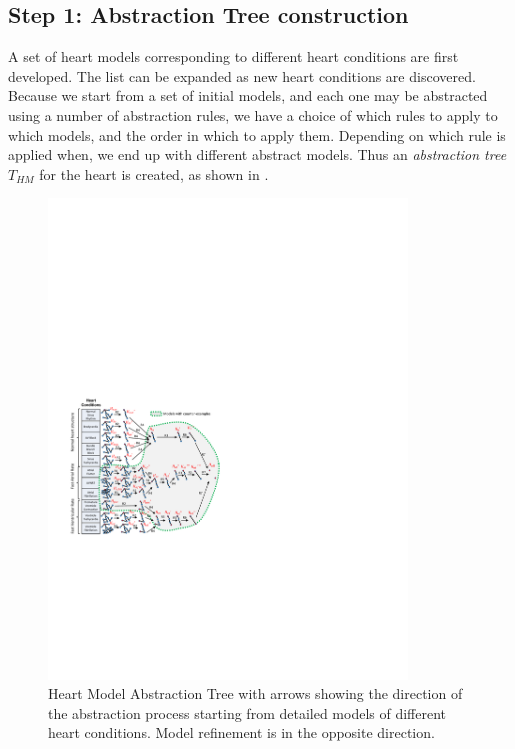 \subsection*{Step 1: Abstraction Tree construction}
A set of heart models corresponding to different heart conditions are first developed. 
The list can be expanded as new heart conditions are discovered.
Because we start from a set of initial models, and each one may be abstracted using a number of abstraction rules, we have a choice of which rules to apply to which models, and the order in which to apply them. 
Depending on which rule is applied when, we end up with different abstract models.
Thus an \emph{abstraction tree} $T_{HM}$ for the heart is created, as shown in . 
\begin{figure}[!t]
	\centering
	\includegraphics[width=0.85\textwidth]{figs/abs.pdf}
	\caption{\small Heart Model Abstraction Tree with arrows showing the direction of the abstraction process starting from detailed models of different heart conditions. Model refinement is in the opposite direction.}
	\vspace{-15pt}
	\label{fig:HM_tree}
\end{figure}

